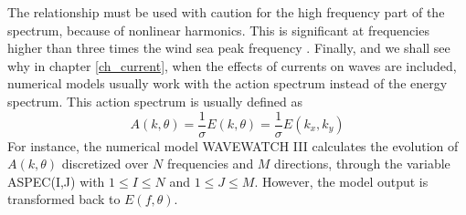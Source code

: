The relationship must be used with caution for the high frequency part of the spectrum, because of nonlinear harmonics. This is significant at frequencies higher than three times the wind sea peak frequency \citep{Leckler&al.2015,Peureux&al.2018}. 
Finally, and we shall see why in chapter \ref{ch_current}, when the effects of currents on  waves are included, numerical models 
usually work with the action spectrum instead of the energy spectrum. This action spectrum is usually defined as 
 \begin{equation}
A(k,\theta)=\frac{1}{\sigma}E(k,\theta)=\frac{1}{\sigma}E(k_{x},k_{y})
\label{eq3.10}
\end{equation}
For instance, the numerical model WAVEWATCH III \citep{Tolman&Booij1998} calculates the evolution of $A(k,\theta)$ discretized over
 $N$ frequencies and $M$ directions, through the variable ASPEC(I,J) with $1 \leq I \leq N $ and $1 \leq J \leq M $. However, 
the model output is transformed back to $E(f,\theta)$.
 

